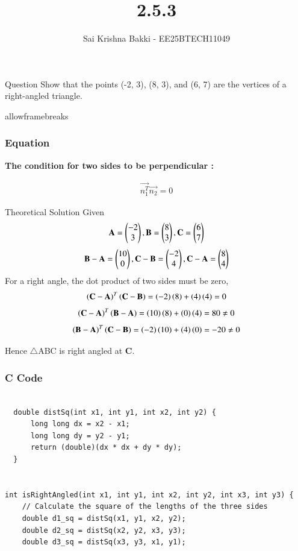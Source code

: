 \documentclass{beamer}
\title %
{2.5.3}
\date{}
\author %
{Sai Krishna Bakki - EE25BTECH11049}
\begin{document}
\frame{\titlepage}
\begin{frame}{Question}
Show that the points (-2, 3), (8, 3), and (6, 7) are the vertices of a right-angled triangle.
\end{frame}
\begin{frame}{allowframebreaks}
		\frametitle{Equation}
	\textbf{The condition for two sides to be perpendicular : }
		\centering
		
		\label{tab:parameters}
		\begin{align*}
			\vec{n_1^T}\vec{n_2}=0
		\end{align*}
		\end{frame}	

\begin{frame}{Theoretical Solution}
Given 
\begin{align}
 \mathbf{A}=\begin{pmatrix}-2\\3\end{pmatrix},
 \mathbf{B}=\begin{pmatrix}8\\3\end{pmatrix},
 \mathbf{C}=\begin{pmatrix}6\\7\end{pmatrix}
\end{align} 
\begin{align}
   \mathbf{B}-\mathbf{A}=\begin{pmatrix}10\\0\end{pmatrix},
   \mathbf{C}-\mathbf{B}=\begin{pmatrix}-2\\4\end{pmatrix},
   \mathbf{C}-\mathbf{A}=\begin{pmatrix}8\\4\end{pmatrix}
\end{align}
For a right angle, the dot product of two sides must be zero,
\begin{align}
\left(\mathbf{C}-\mathbf{A}\right)^T\left(\mathbf{C}-\mathbf{B}\right)=\left(-2\right)\left(8\right)+\left(4\right)\left(4\right)=0
\end{align}
\begin{align}
\left(\mathbf{C}-\mathbf{A}\right)^T\left(\mathbf{B}-\mathbf{A}\right)=\left(10\right)\left(8\right)+\left(0\right)\left(4\right)=80\neq 0
\end{align}
\begin{align}
\left(\mathbf{B}-\mathbf{A}\right)^T\left(\mathbf{C}-\mathbf{B}\right)=\left(-2\right)\left(10\right)+\left(4\right)\left(0\right)=-20\neq 0
\end{align}

Hence $\triangle$ABC is right angled at \textbf{C}.

\end{frame}
\begin{frame}[fragile]
\frametitle{C Code }
\begin{lstlisting}

  double distSq(int x1, int y1, int x2, int y2) {
      long long dx = x2 - x1;
      long long dy = y2 - y1;
      return (double)(dx * dx + dy * dy);
  }


int isRightAngled(int x1, int y1, int x2, int y2, int x3, int y3) {
    // Calculate the square of the lengths of the three sides
    double d1_sq = distSq(x1, y1, x2, y2);
    double d2_sq = distSq(x2, y2, x3, y3);
    double d3_sq = distSq(x3, y3, x1, y1);
    
\end{lstlisting}
\end{frame}  
\end{document}
